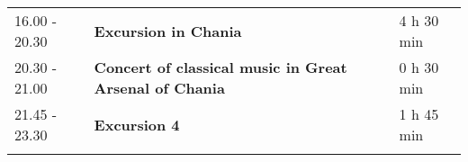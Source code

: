 \begin{longtable}{p{3cm}p{10cm}p{4cm}}
\vspace{1cm}
16.00 - 20.30 & {\bf Excursion in Chania} & \hfill 4 h 30 min\\ 
\vspace{1cm}
20.30 - 21.00 & {\bf Concert of classical music in Great Arsenal of Chania} & \hfill 0 h 30 min\\ 
\vspace{1cm}
21.45 - 23.30 & {\bf Excursion 4} & \hfill 1 h 45 min\\ 
\vspace{1cm}
\end{longtable}

